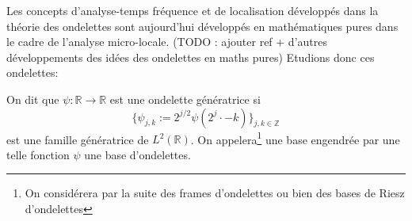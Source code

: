 Les concepts d'analyse-temps fréquence et de localisation développés dans la théorie des ondelettes sont aujourd'hui développés en mathématiques pures dans le cadre de l'analyse micro-locale. (TODO : ajouter ref + d'autres développements des idées des ondelettes en maths pures)
\newline
Etudions donc ces ondelettes:
\begin{definition}
	On dit que $\psi:\mathbb{R} \to \mathbb{R}$ est une ondelette génératrice si 
	\begin{equation}
		\{\psi_{j,k} := 2^{j/2}\psi(2^j\cdot - k)\}_{j,k \in \mathbb{Z}}
	\end{equation}
	est une famille génératrice de $L^2(\mathbb{R})$.
	On appelera\footnote{On considérera par la suite des frames d'ondelettes ou bien des bases de Riesz d'ondelettes} une base engendrée par une telle fonction $\psi$ une base d'ondelettes.
\end{definition}
